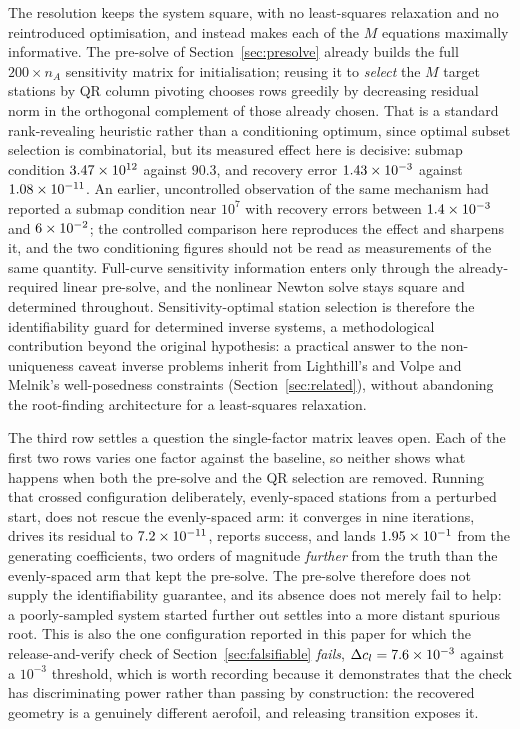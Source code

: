 The resolution keeps the system square, with no least-squares relaxation and
no reintroduced optimisation, and instead makes each of the $M$ equations
maximally informative. The pre-solve of Section~\ref{sec:presolve} already
builds the full $200\times n_A$ sensitivity matrix for initialisation; reusing
it to \emph{select} the $M$ target stations by QR column pivoting chooses
rows greedily by decreasing residual norm in the orthogonal complement of
those already chosen. That is a standard rank-revealing heuristic rather than
a conditioning optimum, since optimal subset selection is combinatorial, but
its measured effect here is decisive: submap condition $3.47\times10^{12}$ against
$90.3$, and recovery error $1.43\times10^{-3}$ against $1.08\times10^{-11}$. An
earlier, uncontrolled observation of the same mechanism had reported a submap
condition near $10^{7}$ with recovery errors between $1.4\times10^{-3}$ and
$6\times10^{-2}$; the controlled comparison here reproduces the effect and sharpens
it, and the two conditioning figures should not be read as measurements of the
same quantity. Full-curve sensitivity information enters only through the
already-required linear pre-solve, and the nonlinear Newton solve stays square
and determined throughout. Sensitivity-optimal station selection is therefore
the identifiability guard for determined inverse systems, a methodological
contribution beyond the original hypothesis: a practical answer to the
non-uniqueness caveat inverse problems inherit from Lighthill's and Volpe and
Melnik's well-posedness constraints (Section~\ref{sec:related}), without
abandoning the root-finding architecture for a least-squares relaxation.

The third row settles a question the single-factor matrix leaves open. Each
of the first two rows varies one factor against the baseline, so neither shows
what happens when both the pre-solve and the QR selection are removed. Running
that crossed configuration deliberately, evenly-spaced stations from a
perturbed start, does not rescue the evenly-spaced arm: it converges in nine
iterations, drives its residual to $7.2\times10^{-11}$, reports success, and lands
$1.95\times10^{-1}$ from the generating coefficients, two orders of magnitude
\emph{further} from the truth than the evenly-spaced arm that kept the
pre-solve. The pre-solve therefore does not supply the identifiability
guarantee, and its absence does not merely fail to help: a poorly-sampled
system started further out settles into a more distant spurious root. This is
also the one configuration reported in this paper for which the
release-and-verify check of Section~\ref{sec:falsifiable} \emph{fails},
$\Delta c_l = 7.6\times10^{-3}$ against a $10^{-3}$ threshold, which is worth
recording because it demonstrates that the check has discriminating power
rather than passing by construction: the recovered geometry is a genuinely
different aerofoil, and releasing transition exposes it.

